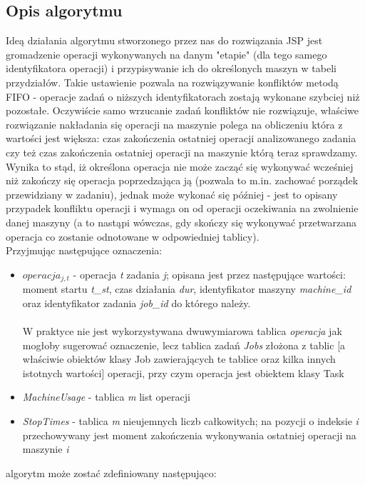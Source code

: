 \documentclass[a4paper,11pt]{article}
\begin{document}
\subsection{Opis algorytmu}
Ideą działania algorytmu stworzonego przez nas do rozwiązania JSP jest gromadzenie operacji wykonywanych na danym "etapie" (dla tego samego identyfikatora operacji) i przypisywanie ich do określonych maszyn w tabeli przydziałów. Takie ustawienie pozwala na rozwiązywanie konfliktów metodą FIFO - operacje zadań o niższych identyfikatorach zostają wykonane szybciej niż pozostałe. Oczywiście samo wrzucanie zadań konfliktów nie rozwiązuje, właściwe rozwiązanie nakładania się operacji na maszynie polega na obliczeniu która z wartości jest większa: czas zakończenia ostatniej operacji analizowanego zadania czy też czas zakończenia ostatniej operacji na maszynie którą teraz sprawdzamy. Wynika to stąd, iż określona operacja nie może zacząć się wykonywać wcześniej niż zakończy się operacja poprzedzająca ją (pozwala to m.in. zachować porządek przewidziany w zadaniu), jednak może wykonać się później - jest to opisany przypadek konfliktu operacji i wymaga on od operacji oczekiwania na zwolnienie danej maszyny (a to nastąpi wówczas, gdy skończy się wykonywać przetwarzana operacja co zostanie odnotowane w odpowiedniej tablicy).\\
Przyjmując następujące oznaczenia:
\begin{itemize}
\item \emph{$operacja_{j,t}$} - operacja \emph{t} zadania \emph{j}; opisana jest przez następujące wartości:\\moment startu \emph{t\_st}, czas działania \emph{dur}, identyfikator maszyny \emph{machine\_id} oraz identyfikator zadania \emph{job\_id} do którego należy.\\\\
W praktyce  nie jest wykorzystywana dwuwymiarowa tablica \emph{operacja} jak mogłoby sugerować oznaczenie, lecz tablica zadań \emph{Jobs} złożona z tablic [a właściwie obiektów klasy Job zawierających te tablice oraz kilka innych istotnych wartości] operacji, przy czym operacja jest obiektem klasy Task
\item \emph{MachineUsage} - tablica \emph{m} list operacji
\item \emph{StopTimes} - tablica \emph{m} nieujemnych liczb całkowitych; na pozycji o indeksie \emph{i} przechowywany jest moment zakończenia wykonywania ostatniej operacji na maszynie \emph{i}
\end{itemize}
algorytm może zostać zdefiniowany następująco:
\end{document}
